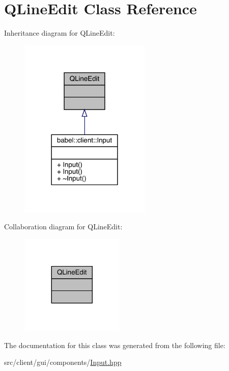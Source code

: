\hypertarget{class_q_line_edit}{}\section{Q\+Line\+Edit Class Reference}
\label{class_q_line_edit}


Inheritance diagram for Q\+Line\+Edit\+:\nopagebreak
\begin{figure}[H]
\begin{center}
\leavevmode
\includegraphics[width=177pt]{class_q_line_edit__inherit__graph}
\end{center}
\end{figure}


Collaboration diagram for Q\+Line\+Edit\+:\nopagebreak
\begin{figure}[H]
\begin{center}
\leavevmode
\includegraphics[width=140pt]{class_q_line_edit__coll__graph}
\end{center}
\end{figure}


The documentation for this class was generated from the following file\+:\begin{DoxyCompactItemize}
\item 
src/client/gui/components/\mbox{\hyperlink{_input_8hpp}{Input.\+hpp}}\end{DoxyCompactItemize}
